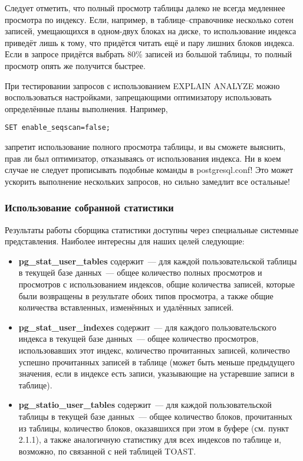 Следует отметить, что полный просмотр таблицы далеко не всегда медленнее просмотра по индексу. Если, например, в 
таблице--справочнике несколько сотен записей, умещающихся в одном-двух блоках на диске, то использование индекса приведёт 
лишь к тому, что придётся читать ещё и пару лишних блоков индекса. Если в запросе придётся выбрать 80\% записей из большой 
таблицы, то полный просмотр опять же получится быстрее.

При тестировании запросов с использованием EXPLAIN ANALYZE можно воспользоваться настройками, запрещающими оптимизатору использовать
определённые планы выполнения. Например,
\begin{verbatim}
SET enable_seqscan=false;
\end{verbatim}

запретит использование полного просмотра таблицы, и вы сможете выяснить, прав ли был оптимизатор, отказываясь от использования 
индекса. Ни в коем случае не следует прописывать подобные команды в postgresql.conf! Это может ускорить выполнение нескольких запросов, 
но сильно замедлит все остальные!

\subsubsection{Использование собранной статистики}
Результаты работы сборщика статистики доступны через специальные системные представления. Наиболее интересны для 
наших целей следующие:
\begin{itemize}
\item \textbf{pg\_stat\_user\_tables} содержит~--- для каждой пользовательской таблицы в текущей базе данных~--- общее количество 
полных просмотров и просмотров с использованием индексов, общие количества записей, которые были возвращены в результате обоих 
типов просмотра, а также общие количества вставленных, изменённых и удалённых записей.
\item \textbf{pg\_stat\_user\_indexes} содержит~--- для каждого пользовательского индекса в текущей базе данных~--- общее количество 
просмотров, использовавших этот индекс, количество прочитанных записей, количество успешно прочитанных записей в таблице (может быть 
меньше предыдущего значения, если в индексе есть записи, указывающие на устаревшие записи в таблице).
\item \textbf{pg\_statio\_user\_tables} содержит~--- для каждой пользовательской таблицы в текущей базе данных~--- общее количество 
блоков, прочитанных из таблицы, количество блоков, оказавшихся при этом в буфере (см. пункт 2.1.1), а также аналогичную статистику 
для всех индексов по таблице и, возможно, по связанной с ней таблицей TOAST.
\end{itemize}


